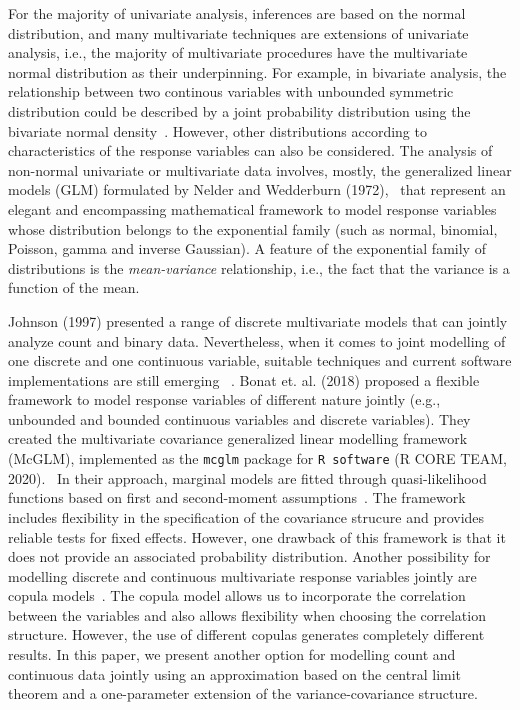 \documentclass[useAMS,referee]{biom}
\begin{document}
For the majority of univariate analysis, inferences are based on the normal distribution, and many multivariate techniques are extensions of univariate analysis, i.e., the majority of multivariate procedures have the multivariate normal distribution as their underpinning. For example, in bivariate analysis, the relationship between two continous variables with unbounded symmetric distribution could be described by a joint probability distribution using the bivariate normal density~\citep{jobson2012applied}. However, other distributions according to characteristics of the response variables can also be considered. The analysis of non-normal univariate or multivariate data involves, mostly, the generalized linear models (GLM) formulated by Nelder and Wedderburn (1972),~\nocite{nelder1972generalized} that represent an elegant and encompassing mathematical framework to model response variables whose distribution belongs to the exponential family (such as normal, binomial, Poisson, gamma and inverse Gaussian). A feature of the exponential family of distributions is the  \textit{mean-variance} relationship, i.e., the fact that the variance is a function of the mean. 

Johnson (1997) presented a range of discrete multivariate models that can jointly analyze count and binary data. Nevertheless, when it comes to joint modelling of one discrete and one continuous variable, suitable techniques and current software implementations are still emerging ~\citep{bonat2016multivariate}. Bonat et. al. (2018) proposed a flexible framework to model response variables of different nature jointly (e.g., unbounded and bounded continuous variables and discrete variables). They created the multivariate covariance generalized linear modelling framework (McGLM), implemented as the \texttt{mcglm} package for \texttt{R software} (R CORE TEAM, 2020).~\nocite{team2020r} In their approach, marginal models are fitted through quasi-likelihood functions based on first and second-moment assumptions~\citep{bonat2017modelling,bonat2018multiple}. The framework includes flexibility in the specification of the covariance strucure and provides reliable tests for fixed effects. However, one drawback of this framework is that it does not provide an associated probability distribution. Another possibility for modelling discrete and continuous multivariate response variables jointly are copula models~\citep{nikoloulopoulos2009modeling,krupskii2013factor}. The copula model allows us to incorporate the correlation between the variables and also allows flexibility when choosing the correlation structure. However, the use of different copulas generates completely different results. In this paper, we present another option for modelling  count and continuous data jointly using an approximation based on the central limit theorem and a one-parameter extension of the variance-covariance structure.
\end{document}
